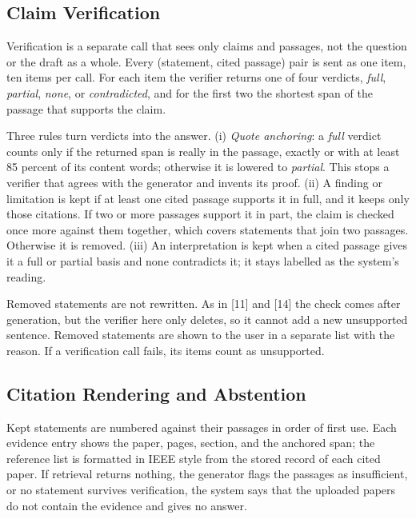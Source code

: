 \documentclass[10pt,twocolumn,letterpaper]{article}
\begin{document}
\subsection{Claim Verification}
Verification is a separate call that sees only claims and passages, not the question or the draft as a whole. Every (statement, cited passage) pair is sent as one item, ten items per call. For each item the verifier returns one of four verdicts, \emph{full}, \emph{partial}, \emph{none}, or \emph{contradicted}, and for the first two the shortest span of the passage that supports the claim.

Three rules turn verdicts into the answer. (i) \emph{Quote anchoring}: a \emph{full} verdict counts only if the returned span is really in the passage, exactly or with at least 85 percent of its content words; otherwise it is lowered to \emph{partial}. This stops a verifier that agrees with the generator and invents its proof. (ii) A finding or limitation is kept if at least one cited passage supports it in full, and it keeps only those citations. If two or more passages support it in part, the claim is checked once more against them together, which covers statements that join two passages. Otherwise it is removed. (iii) An interpretation is kept when a cited passage gives it a full or partial basis and none contradicts it; it stays labelled as the system's reading.

Removed statements are not rewritten. As in [11] and [14] the check comes after generation, but the verifier here only deletes, so it cannot add a new unsupported sentence. Removed statements are shown to the user in a separate list with the reason. If a verification call fails, its items count as unsupported.

\subsection{Citation Rendering and Abstention}
Kept statements are numbered against their passages in order of first use. Each evidence entry shows the paper, pages, section, and the anchored span; the reference list is formatted in IEEE style from the stored record of each cited paper. If retrieval returns nothing, the generator flags the passages as insufficient, or no statement survives verification, the system says that the uploaded papers do not contain the evidence and gives no answer.
\end{document}
